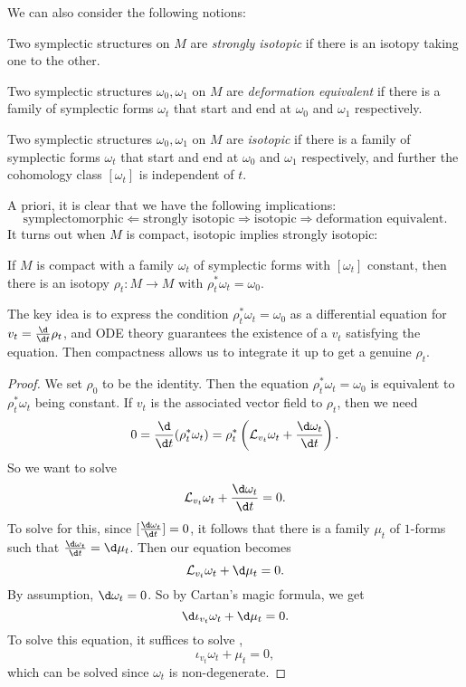 \documentclass[a4paper]{article}
\begin{document}
We can also consider the following notions:
\begin{defi}
  Two symplectic structures on $M$ are \emph{strongly isotopic} if there is an isotopy taking one to the other.
\end{defi}

\begin{defi}
  Two symplectic structures $\omega_0, \omega_1$ on $M$ are \emph{deformation equivalent} if there is a family of symplectic forms $\omega_t$ that start and end at $\omega_0$ and $\omega_1$ respectively.
\end{defi}

\begin{defi}[Isotopic]
  Two symplectic structures $\omega_0, \omega_1$ on $M$ are \emph{isotopic} if there is a family of symplectic forms $\omega_t$ that start and end at $\omega_0$ and $\omega_1$ respectively, and further the cohomology class $[\omega_t]$ is independent of $t$.
\end{defi}

A priori, it is clear that we have the following implications:
\[
  \text{symplectomorphic} \Leftarrow \text{strongly isotopic} \Rightarrow \text{isotopic} \Rightarrow \text{deformation equivalent}.
\]
It turns out when $M$ is compact, isotopic implies strongly isotopic:
\begin{thm}[Moser]
  If $M$ is compact with a family $\omega_t$ of symplectic forms with $[\omega_t]$ constant, then there is an isotopy $\rho_t: M \to M$ with $\rho_t^* \omega_t = \omega_0$.
\end{thm}
The key idea is to express the condition $\rho_t^* \omega_t = \omega_0$ as a differential equation for $v_t = \frac{\d}{\d t} \rho_t$, and ODE theory guarantees the existence of a $v_t$ satisfying the equation. Then compactness allows us to integrate it up to get a genuine $\rho_t$.

\begin{proof}
  We set $\rho_0$ to be the identity. Then the equation $\rho_t^* \omega_t = \omega_0$ is equivalent to $\rho_t^* \omega_t$ being constant. If $v_t$ is the associated vector field to $\rho_t$, then we need
  \[
    0 = \frac{\d}{\d t}(\rho_t^* \omega_t) = \rho_t^* \left(\mathcal{L}_{v_t} \omega_t + \frac{\d \omega_t}{\d t}\right).
  \]
  So we want to solve
  \[
    \mathcal{L}_{v_t} \omega_t + \frac{\d \omega_t}{\d t} = 0.
  \]
  To solve for this, since $[\frac{\d \omega_t}{\d t}] = 0$, it follows that there is a family $\mu_t$ of $1$-forms such that $\frac{\d \omega_t}{\d t} = \d \mu_t$. Then our equation becomes
  \[
    \mathcal{L}_{v_t} \omega_t + \d \mu_t = 0.
  \]
  By assumption, $\d \omega_t = 0$. So by Cartan's magic formula, we get
  \[
    \d \iota_{v_t} \omega_t + \d \mu_t = 0.
  \]
  To solve this equation, it suffices to solve ,
  \[
    \iota_{v_t} \omega_t + \mu_t = 0,
  \]
  which can be solved since $\omega_t$ is non-degenerate.
\end{proof}
\end{document}
